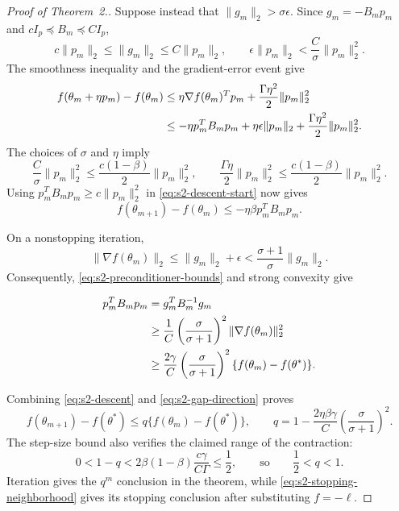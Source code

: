 \documentclass[11pt]{article}
\newcommand\thmMopConvergence{2}
\theoremstyle{thmstylethree}%
\begin{document}
\begin{proof}[Proof of Theorem~{\thmMopConvergence}.]
Suppose instead that $\|g_m\|_2>\sigma\epsilon$.  Since
$g_m=-B_mp_m$ and $cI_p\preceq B_m\preceq CI_p$,
\begin{equation}
c\|p_m\|_2\leq\|g_m\|_2\leq C\|p_m\|_2,
\qquad
\epsilon\|p_m\|_2<\frac{C}{\sigma}\|p_m\|_2^2.              \label{eq:s2-noise-direction-bound}
\end{equation}
The smoothness inequality and the gradient-error event give
\begin{align}
f(\theta_m+\eta p_m)-f(\theta_m)
&\leq\eta\nabla f(\theta_m)^Tp_m
      +\frac{\Gamma\eta^2}{2}\|p_m\|_2^2\notag\\
&\leq-\eta p_m^TB_mp_m
      +\eta\epsilon\|p_m\|_2
      +\frac{\Gamma\eta^2}{2}\|p_m\|_2^2.                    \label{eq:s2-descent-start}
\end{align}
The choices of $\sigma$ and $\eta$ imply
\begin{equation*}
\frac{C}{\sigma}\|p_m\|_2^2
 \leq\frac{c(1-\beta)}2\|p_m\|_2^2,
\qquad
\frac{\Gamma\eta}{2}\|p_m\|_2^2
 \leq\frac{c(1-\beta)}2\|p_m\|_2^2.
\end{equation*}
Using $p_m^TB_mp_m\geq c\|p_m\|_2^2$ in
\eqref{eq:s2-descent-start} now gives
\begin{equation}
f(\theta_{m+1})-f(\theta_m)
\leq-\eta\beta p_m^TB_mp_m.                                  \label{eq:s2-descent}
\end{equation}

On a nonstopping iteration,
\begin{equation}
\|\nabla f(\theta_m)\|_2
 \leq\|g_m\|_2+\epsilon
 <\frac{\sigma+1}{\sigma}\|g_m\|_2.                          \label{eq:s2-gradient-comparison}
\end{equation}
Consequently, \eqref{eq:s2-preconditioner-bounds} and strong convexity give
\begin{samepage}
\begin{align}
p_m^TB_mp_m
 &=g_m^TB_m^{-1}g_m\notag\\
 &\geq\frac1C\left(\frac{\sigma}{\sigma+1}\right)^2
       \|\nabla f(\theta_m)\|_2^2\notag\\
 &\geq\frac{2\gamma}{C}
       \left(\frac{\sigma}{\sigma+1}\right)^2
       \{f(\theta_m)-f(\theta^*)\}.                           \label{eq:s2-gap-direction}
\end{align}
\end{samepage}
Combining \eqref{eq:s2-descent} and \eqref{eq:s2-gap-direction} proves
\begin{equation}
f(\theta_{m+1})-f(\theta^*)
\leq q\{f(\theta_m)-f(\theta^*)\},
\qquad
q=1-\frac{2\eta\beta\gamma}{C}
       \left(\frac{\sigma}{\sigma+1}\right)^2.               \label{eq:s2-linear-rate}
\end{equation}
The step-size bound also verifies the claimed range of the contraction:
\begin{equation*}
0<1-q
<2\beta(1-\beta)\frac{c\gamma}{C\Gamma}
\leq\frac12,
\qquad\text{so}\qquad \frac12<q<1.
\end{equation*}
Iteration gives the $q^m$ conclusion in the theorem, while
\eqref{eq:s2-stopping-neighborhood} gives its stopping conclusion after
substituting $f=-\ell$.
\end{proof}
\end{document}
